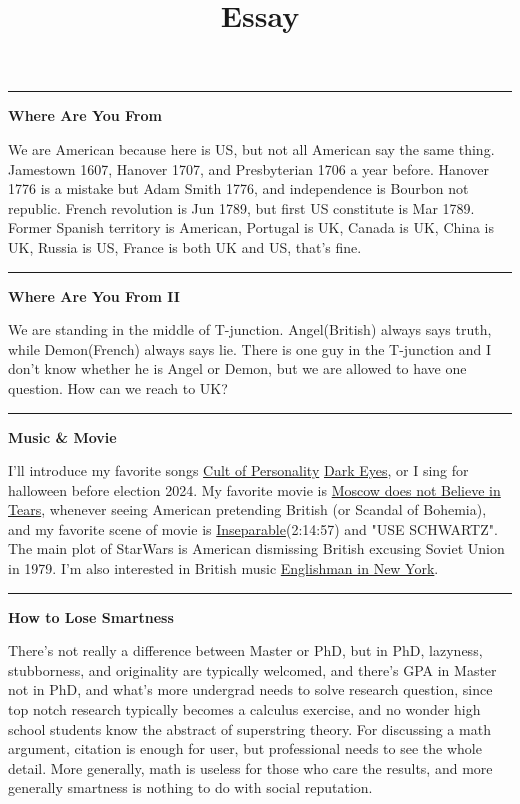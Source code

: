 \documentclass{article}
\title{Essay}
\begin{document}



\noindent\rule{\textwidth}{0.4pt}

\noindent
\textbf{Where Are You From}

\noindent
We are American because here is US, but not all American say the same thing.
Jamestown 1607, Hanover 1707, and Presbyterian 1706 a year before.
Hanover 1776 is a mistake but Adam Smith 1776, and independence is Bourbon not republic.
French revolution is Jun 1789, but first US constitute is Mar 1789.
Former Spanish territory is American, Portugal is UK, Canada is UK, China is UK, Russia is US, France is both UK and US, that's fine.


\noindent\rule{\textwidth}{0.4pt}

\noindent
\textbf{Where Are You From II}

\noindent
We are standing in the middle of T-junction.
Angel(British) always says truth, while Demon(French) always says lie. 
There is one guy in the T-junction and I don't know whether he is Angel or Demon, but we are allowed to have one question.
How can we reach to UK?


\noindent\rule{\textwidth}{0.4pt}

\noindent
\textbf{Music \& Movie}

\noindent
I'll introduce my favorite songs
\href{https://www.youtube.com/watch?v=7xxgRUyzgs0}{Cult of Personality}
\href{https://www.youtube.com/watch?v=SXv69yGyM4g}{Dark Eyes}, or I sing for halloween before election 2024. 
My favorite movie is \href{https://www.youtube.com/watch?v=OT01gwLVWVs}{Moscow does not Believe in Tears}, 
whenever seeing American pretending British (or Scandal of Bohemia),
and my favorite scene of movie is \href{https://www.youtube.com/watch?v=eR3BvjwlK3I&t=8057s}{Inseparable}(2:14:57) and "USE SCHWARTZ".
The main plot of StarWars is American dismissing British excusing Soviet Union in 1979.
I'm also interested in British music \href{https://www.youtube.com/watch?v=eUIs3pKH3j0}{Englishman in New York}.


\noindent\rule{\textwidth}{0.4pt}

\noindent
\textbf{How to Lose Smartness}

\noindent
There's not really a difference between Master or PhD, but in PhD, lazyness, stubborness, and originality are typically welcomed,
and there's GPA in Master not in PhD, and what's more undergrad needs to solve research question,
since top notch research typically becomes a calculus exercise, and no wonder high school students know the abstract of superstring theory.
For discussing a math argument, citation is enough for user, but professional needs to see the whole detail.
More generally, math is useless for those who care the results, and more generally smartness is nothing to do with social reputation. \\
\end{document}
